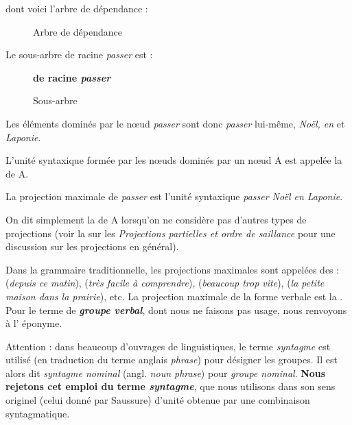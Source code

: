 \z

dont voici l’arbre de dépendance :

\begin{figure}


\caption{\label{fig:}Arbre de dépendance}

\end{figure}

Le sous-arbre de racine \textit{passer} est :

\begin{figure}

\caption{\label{fig:}Sous-arbre} \textbf{de racine \textit{passer}}
\end{figure}

Les éléments dominés par le nœud \textit{passer} sont donc \textit{passer} lui-même, \textit{Noël, en} et \textit{Laponie}.

\begin{styleLivreImportant}
L’unité syntaxique formée par les nœuds dominés par un nœud A est appelée la   de A.
\end{styleLivreImportant}

La projection maximale de \textit{passer} est l’unité syntaxique \textit{passer Noël en Laponie}.

On dit simplement la  de A lorsqu’on ne considère pas d’autres types de projections (voir la  sur les \textit{Projections partielles et ordre de saillance} pour une discussion sur les projections en général).

Dans la grammaire traditionnelle, les projections maximales sont appelées des :  (\textit{depuis ce matin}),  (\textit{très facile à comprendre}),  (\textit{beaucoup trop vite}),  (\textit{la petite maison dans la prairie}), etc. La projection maximale de la forme verbale est la . Pour le terme de \textbf{\textit{groupe verbal}}, dont nous ne faisons pas usage, nous renvoyons à l’ éponyme.

\begin{styleLivreImportant}
Attention : dans beaucoup d’ouvrages de linguistiques, le terme \textit{syntagme} est utilisé (en traduction du terme anglais \textit{phrase}) pour désigner les groupes. Il est alors dit \textit{syntagme nominal} (angl. \textit{noun phrase}) pour \textit{groupe nominal}. \textbf{Nous rejetons cet emploi du terme \textit{syntagme}}, que nous utilisons dans son sens originel (celui donné par Saussure) d’unité obtenue par une combinaison syntagmatique.
\end{styleLivreImportant}

